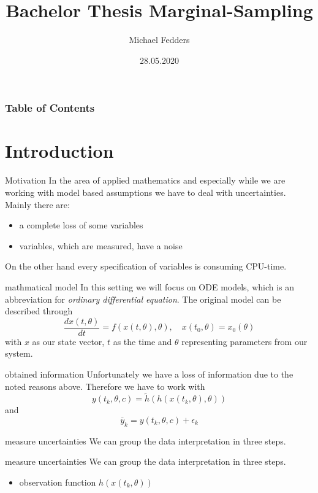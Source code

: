 \documentclass{beamer}
\title{Bachelor Thesis Marginal-Sampling}
\date{28.05.2020}
\author{Michael Fedders}
\begin{document}
	\maketitle
  	\begin{frame}[plain]
		\frametitle{Table of Contents}
		\tableofcontents
	\end{frame}
\section{Introduction}
  	\begin{frame}{Motivation}
	  	In the area of applied mathematics and especially while we are working
	  	with model based assumptions we have to deal with uncertainties. Mainly
	  	there are:
	  	\begin{itemize}
	  		\item a complete \alert{loss} of some variables
	  		\item variables, which are measured, have a \alert{noise}
	  	\end{itemize}
	  	On the other hand every specification of variables is consuming CPU-time.
	\end{frame}
  
  	\begin{frame}{mathmatical model}
     	In this setting we will focus on ODE models, which is an abbreviation for
     	\emph{ordinary differential equation}. The original model can be described
     	through
     	\[
     		\frac{dx(t,\theta)}{dt} = f(x(t,\theta),\theta), \quad x(t_0,\theta) = 			x_0(\theta)
     	\]
     	with $x$ as our state vector, $t$ as the time and $\theta$ representing
     	parameters from our system.
	\end{frame}
	
	\begin{frame}{obtained information}
  		Unfortunately we have a loss of information due to the noted reasons
  		above. Therefore we have to work with
		\[
			y(t_k,\theta,c) = \tilde{h}(h(x(t_k,\theta),\theta))
		\]
		and
		\[
			\overline{y}_{k} = y(t_k,\theta,c) + \epsilon_{k}
		\]
	\end{frame}
	
	
  	\begin{frame}{measure uncertainties}
    	We can group the data interpretation in three steps.      	
  	\end{frame}
  	
  	\begin{frame}{measure uncertainties}
    	We can group the data interpretation in three steps.
  		\begin{itemize}
   			\item observation function $h(x(t_k,\theta))$
    	\end{itemize}
  	\end{frame}
  	
\end{document}
